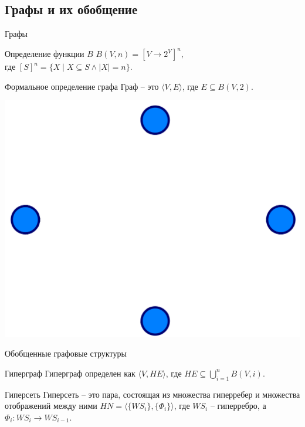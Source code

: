 \documentclass{beamer}
\begin{document}
\begin{darkframes}
		\subsection{Графы и их обобщение}
		\begin{frame}{Графы}
			\begin{block}{Определение функции $B$}
				\centering
				$B(V,n) =[V \rightarrow 2^V ] ^n,$\\ где $[S]^n = \{X \mid X \subseteq S \wedge |X| = n\}$.
			\end{block}
			\begin{block}{Формальное определение графа}
				\centering
				\alert{Граф} -- это $\langle V, E \rangle$,  где $E \subseteq B(V,2)$.
			\end{block}
			\centering
			\includegraphics[scale=0.1]{resources/graph}
		\end{frame}
		\begin{frame}[label=lists]{Обобщенные графовые структуры}
						\begin{block}{Гиперграф}
							\centering
							\alert{Гиперграф} определен как $\langle V, HE\rangle$, где $HE \subseteq \bigcup \limits_{i=1}^{n}B(V,i)$.
						\end{block}
						\begin{block}{Гиперсеть}
							\centering
							\alert{Гиперсеть} -- это пара, состоящая из множества гиперребер и множества отображений между ними $HN = \langle \{WS_i\}, \{\Phi_i\}\rangle$, где $WS_i$ -- гиперребро, а $\Phi_i: WS_i \to WS_{i-1}$.

\end{block}
\end{frame}
\end{darkframes}
\end{document}
